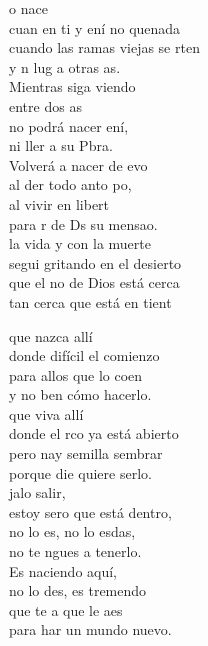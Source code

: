 \begin{cancion}%
	o nace  \\
	cuan en ti y ení no quenada\\
	cuando las ramas viejas se rten\\
	y n lug a otras as.\\
	\jump
	Mientras siga viendo   \\
	entre dos as \\
	no podrá nacer ení,\\
	ni ller a  su Pbra. \\
	\jump
	Volverá a nacer de evo\\
	al der todo anto po, \\
	al vivir en libert\\
	para r de Ds su mensao.\\
	\jump
	 la vida y con la muerte\\
	segui gritando en el desierto  \\
	que el no de Dios está cerca\\
	tan cerca que está en tient\jump\\
	\begin{chorus}%
		 que nazca allí\\
		donde  difícil el comienzo\\
		para allos que lo coen\\
		y no ben cómo hacerlo.\\
	\jump
		 que viva allí\\
		donde el rco ya está abierto\\
		pero nay semilla  sembrar\\
		porque die quiere serlo.\\
	\jump
		jalo salir,\\
		estoy sero que está dentro,\\
		no lo es, no lo esdas,\\
		no te ngues a tenerlo.\\
	\jump
		Es naciendo aquí,\\
		no lo des, es tremendo\\
		que te a que le aes\\
		para har un mundo nuevo.\jump\\
	\end{chorus}%
\end{cancion}%
